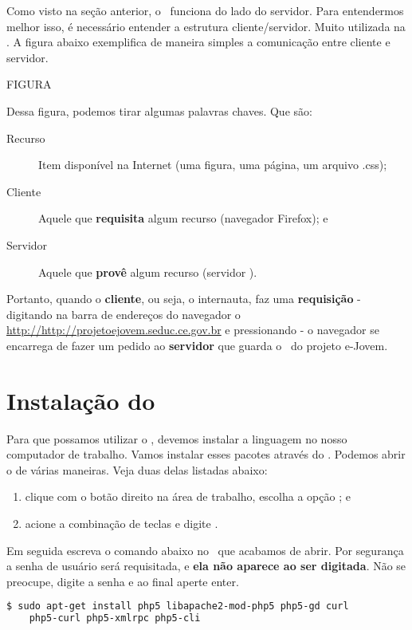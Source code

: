 Como visto na seção anterior, o \php~funciona do lado do servidor. Para entendermos
melhor isso, é necessário entender a estrutura cliente/servidor. Muito utilizada
na \internet. A figura abaixo exemplifica de maneira simples a comunicação entre
cliente e servidor.

FIGURA

Dessa figura, podemos tirar algumas palavras chaves. Que são:
\begin{description}
  \item [Recurso] Item disponível na Internet (uma figura, uma página, um arquivo .css);
  \item [Cliente] Aquele que \textbf{requisita} algum recurso (navegador Firefox); e
  \item [Servidor] Aquele que \textbf{provê} algum recurso (servidor \apache).
\end{description}

Portanto, quando o \textbf{cliente}, ou seja, o internauta, faz uma \textbf{requisição} 
- digitando na barra de endereços do navegador o \site~
\url{http://http://projetoejovem.seduc.ce.gov.br} e pressionando  - o navegador 
se encarrega de fazer um pedido ao \textbf{servidor} que guarda o \site~do projeto e-Jovem.

\section{Instalação do \php}
\label{instalacao-do-php}

Para que possamos utilizar o \php, devemos instalar a linguagem no nosso computador
de trabalho. Vamos instalar esses pacotes através do \terminal. Podemos abrir o
\terminal de várias maneiras. Veja duas delas listadas abaixo:

\begin{enumerate}
	\item clique com o botão direito na área de trabalho, escolha a opção
	; e
	\item acione a combinação de teclas \altfdois e digite \xfceterminal.
\end{enumerate}

Em seguida escreva o comando abaixo no \terminal~que acabamos de abrir. Por segurança
a senha de usuário será requisitada, e \textbf{ela não aparece ao ser digitada}.
Não se preocupe, digite a senha e ao final aperte enter. 

\begin{lstlisting}[language=bash,style=codigos]
  $ sudo apt-get install php5 libapache2-mod-php5 php5-gd curl 
  	php5-curl php5-xmlrpc php5-cli
\end{lstlisting}

